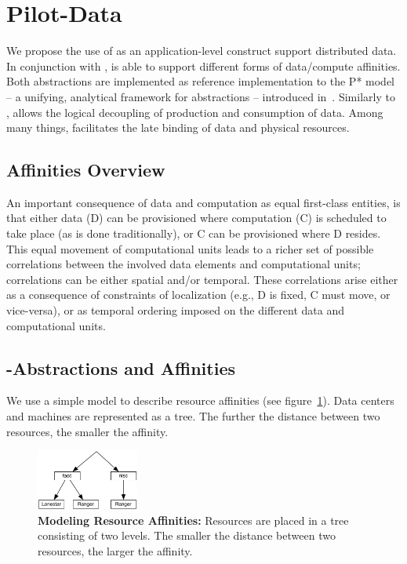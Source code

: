 \documentclass[conference]{IEEEtran}
\begin{document}
\section{Pilot-Data}

We propose the use of \pilotdata as an application-level construct support
distributed data. In conjunction with \pilotjob, \pilotdata is able to support
different forms of data/compute affinities. Both abstractions are implemented
as reference implementation to the P* model -- a unifying, analytical
framework for \pilot abstractions -- introduced in~\cite{pstar11}. 
Similarly to \pilotjobs, \pilotdata allows the logical decoupling
of production and consumption of data. Among many things, \pilotdata 
facilitates the late binding of data and physical resources.  

\subsection{Affinities Overview}

An important consequence of data and computation as equal first-class
entities, is that either data (D) can be provisioned where computation
(C) is scheduled to take place (as is done traditionally), or C can be
provisioned where D resides. This equal movement of computational
units leads to a richer set of possible correlations between the
involved data elements and computational units; correlations can be
either spatial and/or temporal. These correlations arise either as a
consequence of constraints of localization (e.g., D is fixed, C must
move, or vice-versa), or as temporal ordering imposed on the different
data and computational units.


\subsection{\pilot-Abstractions and Affinities}


We use a simple model to describe resource affinities (see
figure~\ref{fig:figures_resource-topologies}). Data centers and machines are
represented as a tree. The further the distance between two resources, the
smaller the affinity.

\begin{figure}[t]
	\centering
		\includegraphics[width=0.3\textwidth]{figures/resource-topologies.pdf}
	\caption{\textbf{Modeling Resource Affinities:} Resources are placed in a 
	tree consisting of two levels. The smaller the distance between two 
	resources, the larger the affinity.}
	\label{fig:figures_resource-topologies}
\end{figure}
\end{document}
